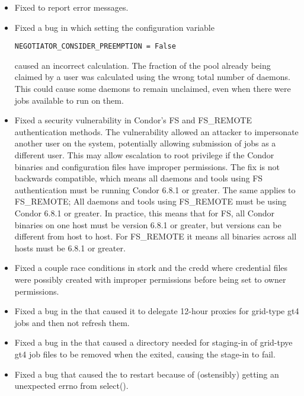 \begin{itemize}
\item Fixed  to report error messages.

\item Fixed a bug in which setting the configuration variable 
\begin{verbatim}
NEGOTIATOR_CONSIDER_PREEMPTION = False
\end{verbatim}
caused an incorrect calculation.
The fraction of the pool already being claimed by a user was
calculated using the wrong total number of  daemons.
This could cause some  daemons to remain unclaimed,
even when there were jobs available to run on them.

\item Fixed a security vulnerability in Condor's FS and FS\_REMOTE
authentication methods.  The vulnerability allowed an attacker to impersonate
another user on the system, potentially allowing submission of jobs as a
different user.  This may allow escalation to root privilege if the Condor
binaries and configuration files have improper permissions.  The fix is not
backwards compatible, which means all daemons and tools using FS authentication
must be running Condor 6.8.1 or greater.  The same applies to FS\_REMOTE; All
daemons and tools using FS\_REMOTE must be using Condor 6.8.1 or greater.  In
practice, this means that for FS, all Condor binaries on one host must be
version 6.8.1 or greater, but versions can be different from host to host.  For
FS\_REMOTE it means all binaries across all hosts must be 6.8.1 or greater.

\item Fixed a couple race conditions in stork and the credd where credential
files were possibly created with improper permissions before being set to owner
permissions.

\item Fixed a bug in the  that caused it to delegate
12-hour proxies for grid-type gt4 jobs and then not refresh them.

\item Fixed a bug in the  that caused a directory
needed for staging-in of grid-tpye gt4 job files to be removed when
the  exited, causing the stage-in to fail.

\item Fixed a bug that caused the  to restart
because of (ostensibly) getting an unexpected errno from select().


\end{itemize}
